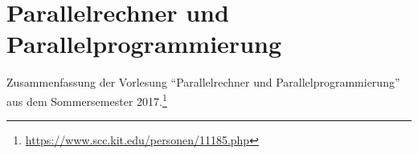 \chapter{Parallelrechner und Parallelprogrammierung}

Zusammenfassung der Vorlesung "`Parallelrechner und Parallelprogrammierung"' aus dem Sommersemester 2017.\footnote{\url{https://www.scc.kit.edu/personen/11185.php}}